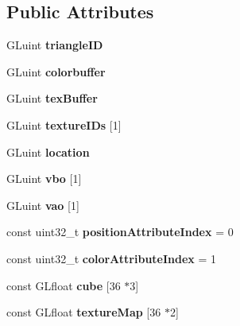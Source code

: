 \subsection*{Public Attributes}
\begin{DoxyCompactItemize}
\item 
\mbox{\label{classBuffer_aa2d894f7e481dd61a30dacdc24aef7db}} 
G\+Luint {\bfseries triangle\+ID}
\item 
\mbox{\label{classBuffer_a3877c8bc8b07fc5e47b7fb177ed53216}} 
G\+Luint {\bfseries colorbuffer}
\item 
\mbox{\label{classBuffer_a2f55237fbb676fb6c5491cd278f13421}} 
G\+Luint {\bfseries tex\+Buffer}
\item 
\mbox{\label{classBuffer_a979553f77dd452ba2efd18e97efaa100}} 
G\+Luint {\bfseries texture\+I\+Ds} \mbox{[}1\mbox{]}
\item 
\mbox{\label{classBuffer_a490dfc9a06ef3d106abe5b9c85edc3ab}} 
G\+Luint {\bfseries location}
\item 
\mbox{\label{classBuffer_afdfff194edb48100d1bdaaef1d673dcd}} 
G\+Luint {\bfseries vbo} \mbox{[}1\mbox{]}
\item 
\mbox{\label{classBuffer_ac2ee2950d10a377c00e3af70cf313149}} 
G\+Luint {\bfseries vao} \mbox{[}1\mbox{]}
\item 
\mbox{\label{classBuffer_a7d73bcf4f6f6c17f81f39a4876a4e073}} 
const uint32\+\_\+t {\bfseries position\+Attribute\+Index} = 0
\item 
\mbox{\label{classBuffer_a4b84bdc1abfc918bc8277d4aa01eb7a1}} 
const uint32\+\_\+t {\bfseries color\+Attribute\+Index} = 1
\item 
\mbox{\label{classBuffer_aec619cc007cef01d2a784ee9aa5daed0}} 
const G\+Lfloat {\bfseries cube} \mbox{[}36 $\ast$3\mbox{]}
\item 
\mbox{\label{classBuffer_a87f7fdbab4aa305177ee0030c25eab1d}} 
const G\+Lfloat {\bfseries texture\+Map} \mbox{[}36 $\ast$2\mbox{]}
\end{DoxyCompactItemize}
